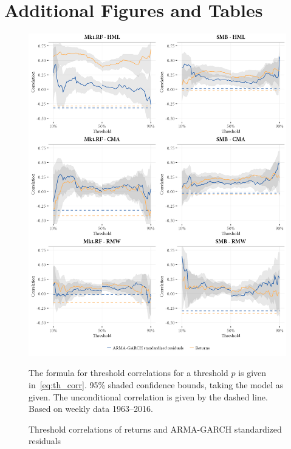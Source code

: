 
\section{Additional Figures and Tables} %
\label{app:supplementary}


\begin{figure}[H]
  \centering
  \includegraphics[scale=1]{graphics/appendix_threshold_1.png}
  \footnotesize
  \caption{Threshold correlations of returns and ARMA-GARCH standardized residuals}
  \begin{longcaption}
    The formula for threshold correlations for a threshold $p$ is given in~\autoref{eq:th_corr}. 95\% shaded confidence bounds, taking the model as given. The unconditional correlation is given by the dashed line. Based on weekly data 1963--2016.
  \end{longcaption}
  \label{fig:appendix_threshold1}
\end{figure}
